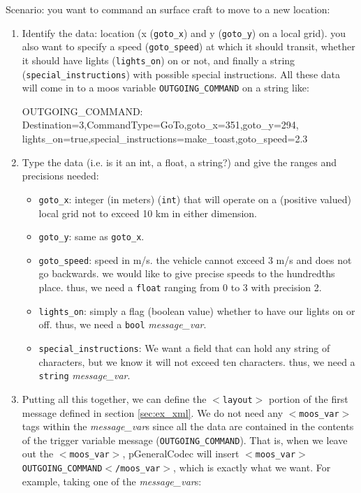 \documentclass[11pt, letterpaper, oneside]{memoir}
\newcommand{\xmltag}[1]{\texttt{$<$#1$>$}}
\begin{document}
\begin{itemize}
Scenario: you want to command an surface craft to move to a new location:
\begin{enumerate}
\item Identify the data: location (x (\verb|goto_x|) and y (\verb|goto_y|) on a local grid). you also want to specify a speed (\verb|goto_speed|) at which it should transit, whether it should have lights (\verb|lights_on|) on or not, and finally a string (\verb|special_instructions|) with possible special instructions. All these data will come in to a moos variable \verb|OUTGOING_COMMAND| on a string like: 
\begin{small}
\begin{boxedverbatim}
OUTGOING_COMMAND: Destination=3,CommandType=GoTo,goto_x=351,goto_y=294,
                  lights_on=true,special_instructions=make_toast,goto_speed=2.3
\end{boxedverbatim}
\resetbvlinenumber
\end{small}
\item Type the data (i.e. is it an int, a float, a string?) and give the ranges and precisions needed: 
\begin{itemize}
\item \verb|goto_x|: integer (in meters) (\verb|int|) that will operate on a (positive valued) local grid not to exceed 10 km in either dimension. 
\item \verb|goto_y|: same as \verb|goto_x|.
\item \verb|goto_speed|: speed in m/s. the vehicle cannot exceed 3 m/s and does not go backwards. we would like to give precise speeds to the hundredths place. thus, we need a \verb|float| ranging from 0 to 3 with precision 2.
\item \verb|lights_on|: simply a flag (boolean value) whether to have our lights on or off. thus, we need a \verb|bool| \textit{message\_var}.
\item \verb|special_instructions|: We want a field that can hold any string of characters, but we know it will not exceed ten characters. thus, we need a \verb|string| \textit{message\_var}.
\end{itemize}
\item Putting all this together, we can define the \xmltag{layout} portion of the first message defined in section \ref{sec:ex_xml}. We do not need any \xmltag{moos\_var} tags within the \textit{message\_var}s since all the data are contained in the contents of the trigger variable message (\verb|OUTGOING_COMMAND|). That is, when we leave out the \xmltag{moos\_var}, pGeneralCodec will insert \xmltag{moos\_var$>$OUTGOING\_COMMAND$<$/moos\_var}, which is exactly what we want. For example, taking one of the \textit{message\_var}s:

\end{enumerate}
\end{itemize}
\end{document}
